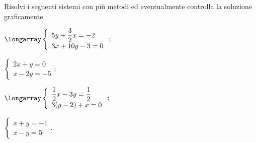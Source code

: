 \begin{esercizio}[\Ast]
 \label{ese:22.71}
 Risolvi i seguenti sistemi con più metodi ed eventualmente controlla
la soluzione graficamente.
\begin{multicols}{2}
\begin{enumeratea}
\item $\longarray\left\{\begin{array}{l}5y+\dfrac{3}{2}x=-2\\3x+10y-3=0 \end{array}\right.;$
\item $\left\{\begin{array}{l}{2x+y=0}\\{x-2y=-5}\end{array}\right.;$
\item $\longarray\left\{\begin{array}{l}\dfrac{1}{2}x-3y=\dfrac{1}{2}\\3(y-2)+x=0 \end{array}\right.;$
\item $\left\{\begin{array}{l}{x+y=-1}\\{x-y=5}\end{array}\right..$
\end{enumeratea}
\end{multicols}
\end{esercizio}


